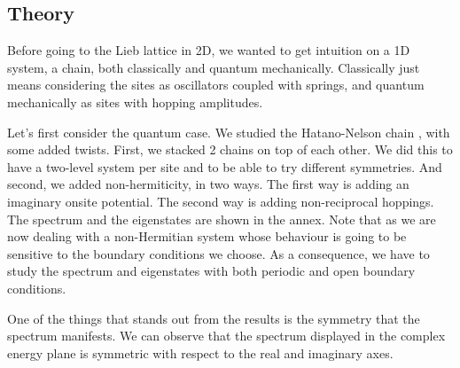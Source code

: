 \documentclass[11pt, a4paper]{article} %
\begin{document}
\subsection{Theory}
\label{subsec:chain_theory}

Before going to the Lieb lattice in 2D, we wanted to get intuition on a 1D system, a chain,
both classically and quantum mechanically. Classically just means considering the sites as oscillators coupled with springs, 
and quantum mechanically as sites with hopping amplitudes. 

Let's first consider the quantum case. We studied the Hatano-Nelson chain \cite{Hatano_1996}, with some added twists.
First, we stacked 2 chains on top of each other. We did this to have a two-level system per site and to be able to try different symmetries.
And second, we added non-hermiticity, in two ways. The first way is adding an imaginary onsite potential. 
The second way is adding non-reciprocal hoppings. The spectrum and the eigenstates are shown in the annex. 
Note that as we are now dealing with a non-Hermitian system whose behaviour is going to be sensitive to the boundary conditions we choose. 
As a consequence, we have to study the spectrum and eigenstates with both periodic and open boundary conditions. 

One of the things that stands out from the results is the symmetry that the spectrum manifests. 
We can observe that the spectrum displayed in the complex energy plane is symmetric with respect to the real and imaginary axes. 
\end{document}
